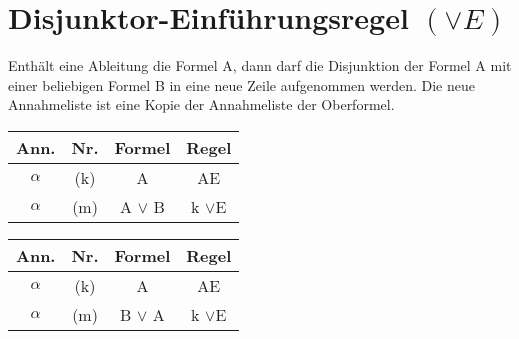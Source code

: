 \documentclass{sajzk}
\begin{document}
\section{Disjunktor-Einführungsregel \texorpdfstring{$(\lor E)$}{(or E)}}
\label{7yg4}
Enthält eine Ableitung die Formel A, dann darf die Disjunktion der Formel A mit
einer beliebigen Formel B in eine neue Zeile aufgenommen werden. Die neue
Annahmeliste ist eine Kopie der Annahmeliste der Oberformel.

\begin{center}
  \begin{minipage}[t]{0.4\textwidth}
    \begin{tabular}{|c|c|c|c|}
      \hline
      Ann.               & Nr.    & Formel       & Regel \\
      \hline
      $\alpha$           & (k)    & A            & AE \\
      \hline
      $\alpha$           & (m)    & A $\lor$ B  & k $\lor$E \\
      \hline
    \end{tabular}
  \end{minipage}
  \begin{minipage}[t]{0.4\textwidth}
    \begin{tabular}{|c|c|c|c|}
      \hline
      Ann.               & Nr.    & Formel       & Regel \\
      \hline
      $\alpha$           & (k)    & A            & AE \\
      \hline
      $\alpha$           & (m)    & B $\lor$ A  & k $\lor$E \\
      \hline
    \end{tabular}
  \end{minipage}
\end{center}
\end{document}
